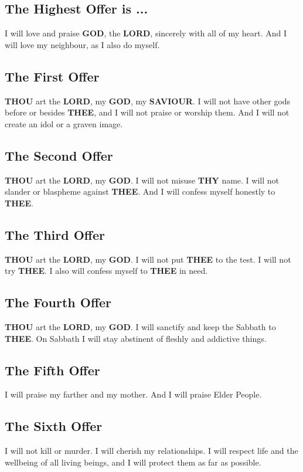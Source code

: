 \documentclass[12pt,a4paper]{article}
\newcommand{\God}[0]{\textbf{GOD}}
\newcommand{\Lord}[0]{\textbf{LORD}}
\newcommand{\Saviour}[0]{\textbf{SAVIOUR}}
\newcommand{\Thee}[0]{\textbf{THEE}}
\newcommand{\Thou}[0]{\textbf{THOU}}
\newcommand{\Thy}[0]{\textbf{THY}}
\begin{document}
	\subsection{The Highest Offer is ...}
		I will love and praise {\God},
		the {\Lord},
		sincerely with all of my heart.
		And I will love my neighbour,
		as I also do myself.
		
	\subsection{The First Offer}
		{\Thou} art the {\Lord},
		my {\God},
		my {\Saviour}.
		I will not have other gods before or besides {\Thee},
		and I will not praise or worship them.
		And I will not create an idol or a graven image.
		
	\subsection{The Second Offer}
		{\Thou} art the {\Lord},
		my {\God}.
		I will not misuse {\Thy} name.
		I will not slander or blaspheme against {\Thee}.
		And I will confess myself honestly to {\Thee}.
			
	\subsection{The Third Offer}
		{\Thou} art the {\Lord},
		my {\God}.
		I will not put {\Thee} to the test.
		I will not try {\Thee}.
		I also will confess myself to {\Thee} in need.
		
	\subsection{The Fourth Offer}
		{\Thou} art the {\Lord},
		my {\God}.
		I will sanctify and keep the Sabbath to {\Thee}.
		On Sabbath I will stay abstinent of fleshly
		and addictive things.
		
	\subsection{The Fifth Offer}
		I will praise my farther and my mother.
		And I will praise Elder People.
			
	\subsection{The Sixth Offer}
		I will not kill or murder.
		I will cherish my relationships.
		I will respect life and the wellbeing of all living beings,
		and I will protect them as far as possible.
		
\end{document}
